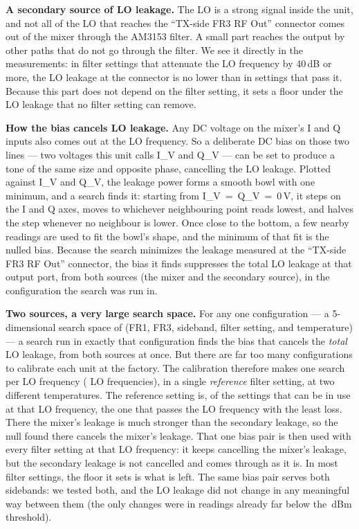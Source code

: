 \textbf{A secondary source of LO leakage.} The LO is a strong signal inside the unit, and not all of the LO that
reaches the ``TX-side FR3 RF Out'' connector comes out of the mixer through the AM3153 filter. A small part reaches the
output by other paths that do not go through the filter. We see it directly in the measurements: in filter settings
that attenuate the LO frequency by 40\,dB or more, the LO leakage at the connector is no lower than in settings that
pass it. Because this part does not depend on the filter setting, it sets a floor under the LO leakage that no filter
setting can remove.

\textbf{How the bias cancels LO leakage.} Any DC voltage on the mixer's I and Q inputs also comes out at the LO
frequency. So a deliberate DC bias on those two lines --- two voltages this unit calls I\_V and Q\_V --- can be set to
produce a tone of the same size and opposite phase, cancelling the LO leakage. Plotted against I\_V and Q\_V, the
leakage power forms a smooth bowl with one minimum, and a search finds it: starting from I\_V~=~Q\_V~=~0\,V, it steps
on the I and Q axes, moves to whichever neighbouring point reads lowest, and halves the step whenever no neighbour is
lower. Once close to the bottom, a few nearby readings are used to fit the bowl's shape, and the minimum of that fit is
the nulled bias. Because the search minimizes the leakage measured at the ``TX-side FR3 RF Out'' connector, the bias it finds suppresses the total LO leakage at that output port, from both sources (the mixer and the secondary source), in the configuration the search was run in.

\textbf{Two sources, a very large search space.} For any one configuration --- a 5-dimensional search space of (FR1, FR3, sideband, filter setting, and temperature)
--- a search run in exactly that configuration finds the bias that cancels the \emph{total} LO leakage, from both
sources at once. But there are far too many configurations to calibrate each unit at the factory. The calibration
therefore makes one search per LO frequency (\calLoCount{} LO frequencies), in a single \emph{reference} filter setting,
at two different temperatures. The reference setting is, of the settings that can be in use at that LO frequency, the
one that passes the LO frequency with the least loss. There the mixer's leakage is
much stronger than the secondary leakage, so the null found there cancels the mixer's leakage. That one bias pair is
then used with every filter setting at that LO frequency: it keeps cancelling the mixer's leakage, but the secondary
leakage is not cancelled and comes through as it is. In most filter settings, the floor it sets is what is left. The
same bias pair serves both sidebands: we tested both, and the LO leakage did not change in any meaningful way between
them (the only changes were in readings already far below the \calThreshold\,dBm threshold).

